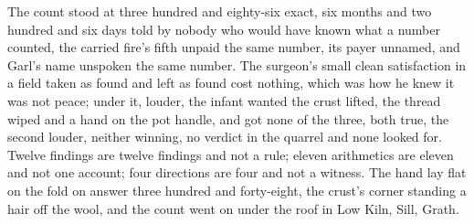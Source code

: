The count stood at three hundred and eighty-six exact, six months and two hundred and six days told by nobody who would have known what a number counted, the carried fire's fifth unpaid the same number, its payer unnamed, and Garl's name unspoken the same number. The surgeon's small clean satisfaction in a field taken as found and left as found cost nothing, which was how he knew it was not peace; under it, louder, the infant wanted the crust lifted, the thread wiped and a hand on the pot handle, and got none of the three, both true, the second louder, neither winning, no verdict in the quarrel and none looked for. Twelve findings are twelve findings and not a rule; eleven arithmetics are eleven and not one account; four directions are four and not a witness. The hand lay flat on the fold on answer three hundred and forty-eight, the crust's corner standing a hair off the wool, and the count went on under the roof in Low Kiln, Sill, Grath.
